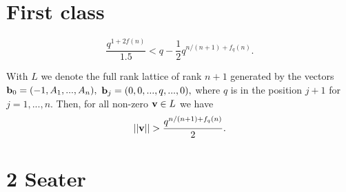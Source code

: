\documentclass[oneside]{book}
\begin{document}
    \section{First class}

    \begin{equation}\label{asterisq2}
        \frac{q^{1+2f(n)}}{1.5}<q - \frac{1}{2}q^{n/(n+1)+f_q(n)}.
    \end{equation}
        
    With $L$ we denote the full rank lattice of rank $n+1$ generated by the vectors
    ${\bf b}_0 = (-1,A_1,...,A_{n}),$
    ${\bf b}_j = (0,0,...,q,...,0),$ where $q$ is in the position $j+1$ for $j=1,...,n.$ Then, for all non-zero ${\bf v}\in L$ we have
    $$||{\bf v}||>\frac{q^{n/(n+1)+f_q(n)}}{2}.$$

    \section{2 Seater}

    \begin{center}
    \end{center}

    \begin{example}
        \lipsum[1]
    \end{example}

    
\end{document}
